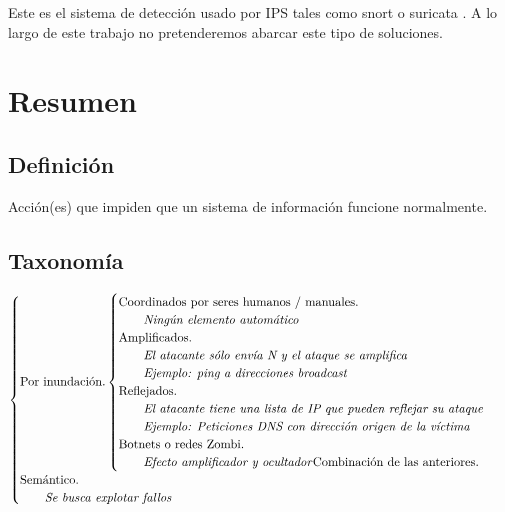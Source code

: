 Este es el sistema de detección usado por IPS tales como snort \cite{snort} o suricata \cite{suricata}. A lo largo de 
este trabajo no pretenderemos abarcar este tipo de soluciones.

\section{Resumen}%

\begin{Resumen}
\subsection*{Definición}
Acción(es) que impiden que un sistema de información funcione normalmente.

\subsection*{Taxonomía}
\begin{align*}
 \begin{cases}
   \text{Por inundación.}
   \begin{cases}
     \text{Coordinados por seres humanos / manuales.}\\
     \qquad\text{\emph{Ningún elemento automático}}\\
     \text{Amplificados.}\\
     \qquad{\text{\emph{El atacante sólo envía N y el ataque se amplifica}}}\\
     \qquad{\text{\emph{Ejemplo: ping a direcciones broadcast}}}\\
     \text{Reflejados.}\\
     \qquad{\text{\emph{El atacante tiene una lista de IP que pueden reflejar su ataque}}}\\
     \qquad{\text{\emph{Ejemplo: Peticiones DNS con dirección origen de la víctima}}}\\
     \text{Botnets o redes Zombi.}\\
     \qquad{\text{\emph{Efecto amplificador y ocultador}}}
     \text{Combinación de las anteriores.}
   \end{cases}\\
   \text{Semántico.}\\
   \qquad{\text{\emph{Se busca explotar fallos}}}
 \end{cases}
\end{align*}


\end{Resumen}
